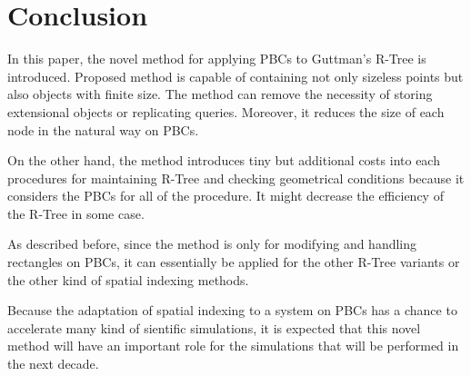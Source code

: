 \documentclass[10pt,letterpaper,twocolumn]{article}
\begin{document}
\section*{Conclusion}

In this paper, the novel method for applying PBCs to Guttman's R-Tree is
introduced. Proposed method is capable of containing not only sizeless points
but also objects with finite size. The method can remove the necessity of
storing extensional objects or replicating queries. Moreover, it reduces the
size of each node in the natural way on PBCs.

On the other hand, the method introduces tiny but additional costs into each
procedures for maintaining R-Tree and checking geometrical conditions because it
considers the PBCs for all of the procedure. It might decrease the efficiency of
the R-Tree in some case.

As described before, since the method is only for modifying and handling
rectangles on PBCs, it can essentially be applied for the other R-Tree variants
or the other kind of spatial indexing methods.

Because the adaptation of spatial indexing to a system on PBCs has a chance to
accelerate many kind of sientific simulations, it is expected that this novel
method will have an important role for the simulations that will be performed in
the next decade.


{}
\end{document}
